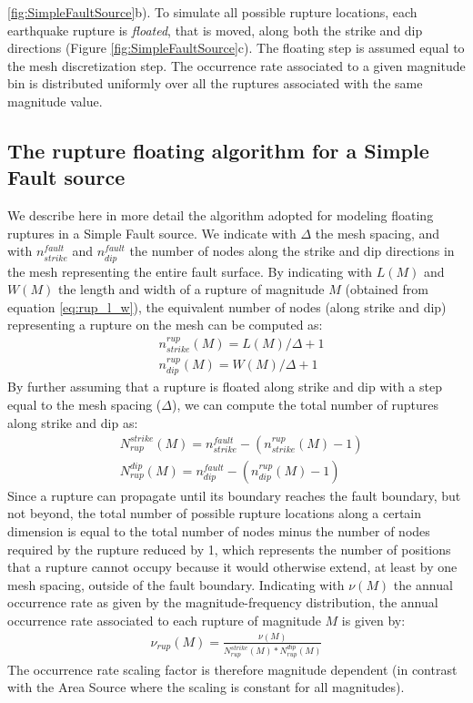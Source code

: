 \ref{fig:SimpleFaultSource}b). To simulate all possible rupture locations, each
earthquake rupture is \textit{floated}, that is moved, along both the strike and
dip directions (Figure \ref{fig:SimpleFaultSource}c). 
%
The floating step is assumed equal to the mesh discretization step.  The
occurrence rate associated to a given magnitude bin is distributed uniformly
over all the ruptures associated with the same magnitude value.  \subsection{The
rupture floating algorithm for a Simple Fault source} We describe here in more
detail the algorithm adopted for modeling floating ruptures in a Simple Fault
source. We indicate with $\Delta$ the mesh spacing, and with
$n_{strike}^{fault}$ and $n_{dip}^{fault}$ the number of nodes along the strike
and dip directions in the mesh representing the entire fault surface. By
indicating with $L(M)$ and $W(M)$ the length and width of a rupture of magnitude
$M$ (obtained from equation \ref{eq:rup_l_w}), the equivalent number of nodes
(along strike and dip) representing a rupture on the mesh can be computed as:
\begin{equation} \label{eq:rup_nodes}
\begin{split}
& n_{strike}^{rup}(M) =  L(M) / \Delta + 1 \\
& n_{dip}^{rup}(M)     = W(M) / \Delta + 1 
\end{split}
\end{equation}
By further assuming that a rupture is floated along strike and dip with a step
equal to the mesh spacing ($\Delta$), we can compute the total number of
ruptures along strike and dip as:
\begin{equation}
\begin{split}
& N_{rup}^{strike}(M) = n_{strike}^{fault} - (n_{strike}^{rup}(M) - 1) \\
& N_{rup}^{dip}(M)     = n_{dip}^{fault} - (n_{dip}^{rup}(M) - 1)
\end{split}
\end{equation}
Since a rupture can propagate until its boundary reaches the fault boundary, but
not beyond, the total number of possible rupture locations along a certain
dimension is equal to the total number of nodes minus the number of nodes
required by the rupture reduced by 1, which represents the number of positions
that a rupture cannot occupy because it would otherwise extend, at least by one
mesh spacing, outside of the fault boundary.  Indicating with $\nu(M)$ the
annual occurrence rate as given by the magnitude-frequency distribution, the
annual occurrence rate associated to each rupture of magnitude $M$ is given by:
\begin{align}
\nu_{rup}(M) = \frac{\nu(M)}{N_{rup}^{strike}(M) * N_{rup}^{dip}(M)}
\end{align}
The occurrence rate scaling factor is therefore magnitude dependent (in contrast
with the Area Source where the scaling is constant for all magnitudes).
